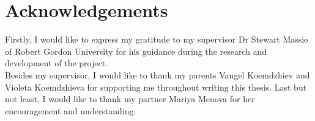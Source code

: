 \chapter{Acknowledgements}
Firstly, I would like to express my gratitude to my supervisor Dr Stewart Massie of Robert Gordon University for his guidance during the research and development of the project. \\

\noindent Besides my supervisor, I would like to thank my parents Vangel Koemdzhiev and Violeta Koemdzhieva for supporting me throughout writing this thesis. Last but not least, I would like to thank my partner Mariya Menova for her encouragement and understanding.
